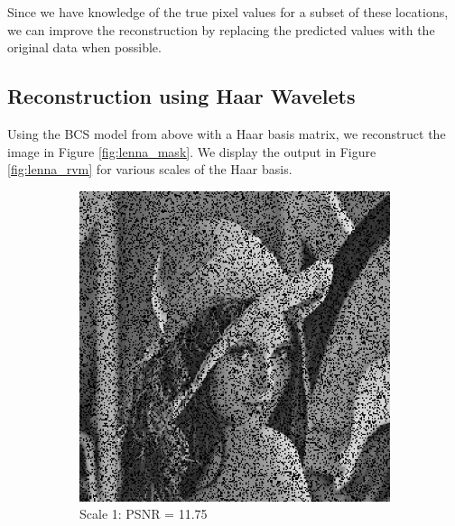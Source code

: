 Since we have knowledge of the true pixel values for a subset of these locations, we can improve the reconstruction by replacing the predicted values with the original data when possible.

\subsection{Reconstruction using Haar Wavelets}
Using the BCS model from above with a Haar basis matrix, we reconstruct the image in Figure \ref{fig:lenna_mask}.
We display the output in Figure \ref{fig:lenna_rvm} for various scales of the Haar basis.
\begin{figure}
\centering
  \begin{subfigure}{0.4\textwidth}
    \includegraphics[width=\textwidth]{Chapter5/Images/lenna_haar1.png}
    \caption{Scale 1: PSNR = 11.75}
  \end{subfigure}
  \begin{subfigure}{0.4\textwidth}

\end{subfigure}
\end{figure}
